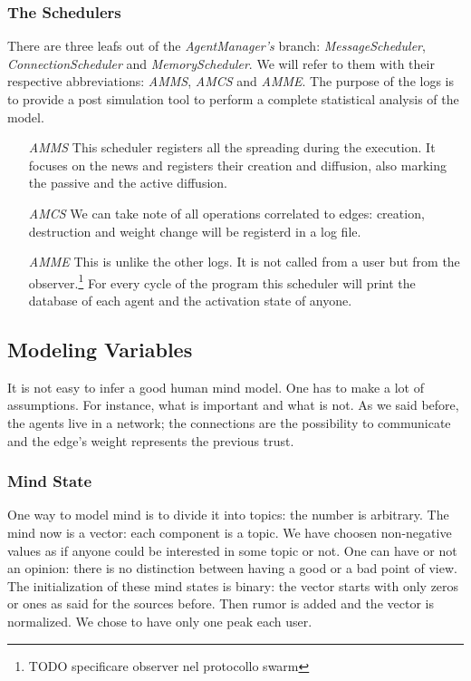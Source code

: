\subsubsection{The Schedulers}
There are three leafs out of the \textit{AgentManager's} branch:
\textit{MessageScheduler}, \textit{ConnectionScheduler} and
\textit{MemoryScheduler}. We will refer to them with their
respective abbreviations: \textit{AMMS}, \textit{AMCS} and \textit{AMME}.
The purpose of the logs is to provide a post simulation tool to perform
a complete statistical analysis of the model. 
\begin{itemize}
\item [\textit{AMMS}] This scheduler registers all the spreading during the
  execution. It focuses on the news and registers their creation and
  diffusion, also marking the passive and the active diffusion.
\item [\textit{AMCS}] We can take note of all operations correlated
  to edges: creation, destruction and weight change will
  be registerd in a log file.
\item [\textit{AMME}] This is unlike the other logs. It is not
  called from a user but from the observer.\footnote{TODO specificare
  observer nel protocollo swarm} For every cycle of the program
  this scheduler will print the database of each agent and the activation
  state of anyone.
\end{itemize}

\subsection{Modeling Variables}
It is not easy to infer a good human mind model. One has to make
a lot of assumptions. For instance, what is important and what is not.
As we said before, the agents live in a network; the connections are the
possibility to communicate and the edge's weight represents the previous
trust.

\subsubsection{Mind State}
One way to model mind is to divide it into topics: the number is arbitrary.
The mind now is a vector: each component is a topic. We have choosen
non-negative values as if anyone could be interested in some topic or not.
One can have or not an opinion: there is no distinction between
having a good or a bad point of view.
The initialization of these mind states is binary: the vector starts
with only zeros or ones as said for the sources before. Then rumor is added
and the vector is normalized. We chose to have only one peak each user.

